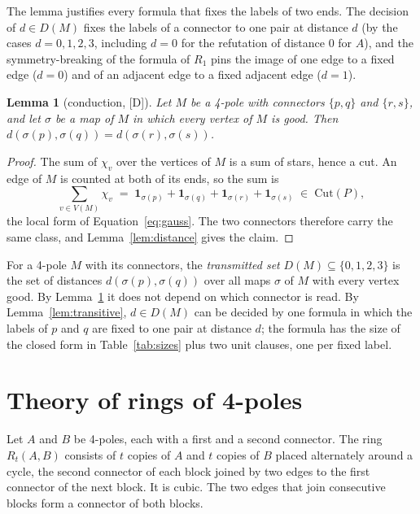 \documentclass[11pt]{article}
\newtheorem{lemma}[theorem]{Lemma}
\theoremstyle{definition}
\theoremstyle{remark}
\newcommand{\PG}{P}
\newcommand{\Cut}{\mathrm{Cut}}
\newcommand{\claim}[1]{\textup{[#1]}}
\begin{document}
The lemma justifies every formula that fixes the labels of two ends. The decision of $d \in D(M)$ fixes the labels of a connector to one pair at distance $d$
(by the cases $d = 0, 1, 2, 3$, including $d = 0$ for the refutation of distance 0 for $A$), and the symmetry-breaking of the formula of $R_1$
pins the image of one edge to a fixed edge ($d = 0$) and of an adjacent edge to a fixed adjacent edge ($d = 1$).

\begin{lemma}[conduction, \claim{D}]\label{lem:conduction}
Let $M$ be a 4-pole with connectors $\{p, q\}$ and $\{r, s\}$, and let $\sigma$ be a map of $M$ in
which every vertex of $M$ is good. Then $d(\sigma(p), \sigma(q)) = d(\sigma(r), \sigma(s))$.
\end{lemma}

\begin{proof}
The sum of $\chi_v$ over the vertices of $M$ is a sum of stars, hence a cut. An edge of $M$ is
counted at both of its ends, so the sum is
\begin{equation}\label{eq:local}
\sum_{v \in V(M)} \chi_v \;=\; \mathbf{1}_{\sigma(p)} + \mathbf{1}_{\sigma(q)} + \mathbf{1}_{\sigma(r)} + \mathbf{1}_{\sigma(s)} \;\in\; \Cut(\PG),
\end{equation}
the local form of Equation~\eqref{eq:gauss}. The two connectors therefore carry the same class,
and Lemma~\ref{lem:distance} gives the claim.
\end{proof}

For a 4-pole $M$ with its connectors, the \emph{transmitted set} $D(M) \subseteq \{0, 1, 2, 3\}$ is
the set of distances $d(\sigma(p), \sigma(q))$ over all maps $\sigma$ of $M$ with every vertex
good. By Lemma~\ref{lem:conduction} it does not depend on which connector is read. By
Lemma~\ref{lem:transitive}, $d \in D(M)$ can be decided by one formula in which the labels of $p$ and $q$ are
fixed to one pair at distance $d$; the formula has the size of the closed form in Table~\ref{tab:sizes}
plus two unit clauses, one per fixed label.

\section{Theory of rings of 4-poles}\label{sec:rings}

Let $A$ and $B$ be 4-poles, each with a first and a second connector. The ring $R_t(A, B)$ consists
of $t$ copies of $A$ and $t$ copies of $B$ placed alternately around a cycle, the second connector
of each block joined by two edges to the first connector of the next block. It is cubic. The two
edges that join consecutive blocks form a connector of both blocks.
\end{document}
